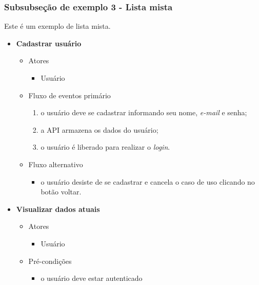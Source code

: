 \subsubsection{Subsubseção de exemplo 3 - Lista mista} \label{subsubsec:mista}

Este é um exemplo de lista mista.

\begin{itemize}
	\item \textbf{Cadastrar usuário}

		\begin{itemize}
    		\item Atores
		    	\begin{itemize}
    		    	\item Usuário
		    	\end{itemize}

	    	\item Fluxo de eventos primário
			    \begin{enumerate}
	    		    \item o usuário deve se cadastrar informando seu nome, \textit{e-mail} e senha;
		        	\item a API armazena os dados do usuário;
		    	    \item o usuário é liberado para realizar o \textit{login}.
			    \end{enumerate}

    		\item Fluxo alternativo
			    \begin{itemize}
		    	   \item o usuário desiste de se cadastrar e cancela o caso de uso clicando no botão voltar.
	    		\end{itemize}

		\end{itemize}

	\item \textbf{Visualizar dados atuais}

		\begin{itemize}
		    \item Atores
	    		\begin{itemize}
		    	    \item Usuário
			    \end{itemize}
    
	    	\item Pré-condições
			    \begin{itemize}
		     	   \item o usuário deve estar autenticado
			    \end{itemize}


\end{itemize}
\end{itemize}
